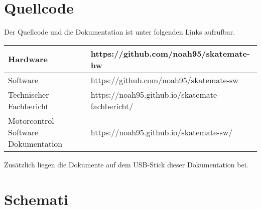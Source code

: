 \section{Quellcode}
Der Quellcode und die Dokumentation ist unter folgenden Links aufrufbar.
\begin{center}
	\begin{tabular}{l|l}
		\hline 
		Hardware & https://github.com/noah95/skatemate-hw \\ \hline
		Software & https://github.com/noah95/skatemate-sw \\ \hline
		Technischer Fachbericht & https://noah95.github.io/skatemate-fachbericht/ \\ \hline
		Motorcontrol Software Dokumentation & https://noah95.github.io/skatemate-sw/ \\ \hline
	\end{tabular} 
\end{center}

Zusätzlich liegen die Dokumente auf dem USB-Stick dieser Dokumentation bei.

\section{Schemati}


